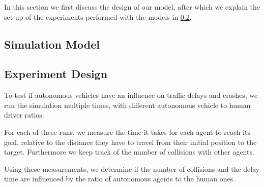 In this section we first discuss the design of our model, after which we explain the set-up of the experiments performed with the models in \cref{sub:method:design}.

\subsection{Simulation Model}
\label{sub:method:model}



\subsection{Experiment Design}
\label{sub:method:design}
To test if autonomous vehicles have an influence on traffic delays and crashes, we run the simulation multiple times, with different autonomous vehicle to human driver ratios.

For each of these runs, we measure the time it takes for each agent to reach its goal, relative to the distance they have to travel from their initial position to the target. Furthermore we keep track of the number of collisions with other agents. 

Using these measurements, we  determine if the number of collisions and the delay time are influenced by the ratio of autonomous agents to the human ones. 



